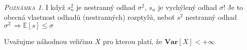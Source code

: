 \documentclass[oneside,intlimits,reqno]{scrbook}
\theoremstyle{definition}
\theoremstyle{plain}
\theoremstyle{remark}
\newtheorem{remark}[define]{\textsc{Poznámka}}
\begin{document}
\begin{remark}
I když $ s^{2}_{n} $ je nestranný odhad $ \sigma^{2} $, $ s_{n} $ je vychýlený odhad $ \sigma $!
Je to obecná vlastnost odhadů (nestranných) rozptylů, neboť $ s^{2} $ nestranný odhad $ \sigma^{2} \, \Rightarrow \mathbb{E}[s] \leq \sigma $ 
\end{remark}

Uvažujme náhodnou veličinu $ X $  pro kterou platí, že $ \textbf{Var} [ X ] < + \infty $
\end{document}
